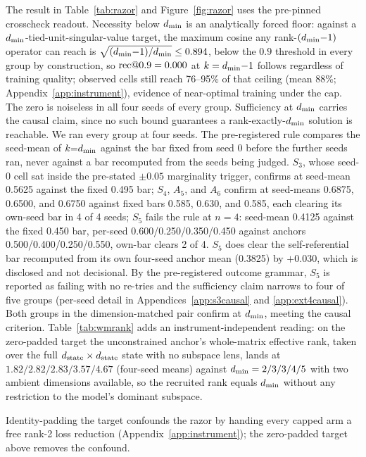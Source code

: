 The result in Table~\ref{tab:razor} and Figure~\ref{fig:razor} uses the
pre-pinned crosscheck readout. Necessity below $d_{\min}$ is
an analytically forced floor: against a $d_{\min}$-tied-unit-singular-value
target, the maximum cosine any rank-$(d_{\min}{-}1)$ operator can reach is
$\sqrt{(d_{\min}{-}1)/d_{\min}} \le 0.894$, below the $0.9$ threshold in every
group by construction, so $\mathrm{rec}@0.9 = 0.000$ at $k = d_{\min}{-}1$ follows
regardless of training quality; observed cells still reach 76--95\% of
that ceiling (mean 88\%; Appendix~\ref{app:instrument}), evidence of
near-optimal training under the cap.
The zero is noiseless in all four seeds of every group.
Sufficiency at $d_{\min}$ carries the causal claim, since no such bound
guarantees a rank-exactly-$d_{\min}$ solution is reachable. We ran every group
at four seeds. The pre-registered rule compares the seed-mean of
$k{=}d_{\min}$ against the bar fixed from seed 0 before the further seeds ran,
never against a bar recomputed from the seeds being judged. $S_3$, whose
seed-0 cell sat inside the pre-stated $\pm 0.05$
marginality trigger, confirms at seed-mean 0.5625 against the fixed
0.495 bar;
$S_4$, $A_5$, and $A_6$ confirm at seed-means 0.6875, 0.6500, and
0.6750 against fixed bars 0.585, 0.630, and 0.585, each clearing its
own-seed bar in 4 of 4 seeds; $S_5$ fails the rule at $n = 4$:
seed-mean 0.4125 against the fixed 0.450 bar, per-seed
0.600/0.250/0.350/0.450 against anchors 0.500/0.400/0.250/0.550,
own-bar clears 2 of 4. $S_5$ does clear the self-referential bar
recomputed from its own four-seed anchor mean (0.3825) by $+0.030$,
which is disclosed and not decisional. By the pre-registered outcome
grammar, $S_5$ is reported as failing with no re-tries and the
sufficiency claim narrows to four of five groups (per-seed detail in
Appendices~\ref{app:s3causal} and \ref{app:ext4causal}).
Both groups in the dimension-matched pair confirm at $d_{\min}$, meeting the
causal criterion.
Table~\ref{tab:wmrank} adds an instrument-independent reading: on the
zero-padded target the unconstrained anchor's whole-matrix effective rank,
taken over the full $d_{\mathrm{state}} \times d_{\mathrm{state}}$ state with no subspace lens,
lands at $1.82/2.82/2.83/3.57/4.67$ (four-seed means) against
$d_{\min} = 2/3/3/4/5$ with two ambient dimensions available, so the recruited
rank equals $d_{\min}$ without any restriction to the model's dominant subspace.

Identity-padding the target confounds the razor by handing every capped
arm a free rank-2 loss reduction (Appendix~\ref{app:instrument});
the zero-padded target above removes the confound.
